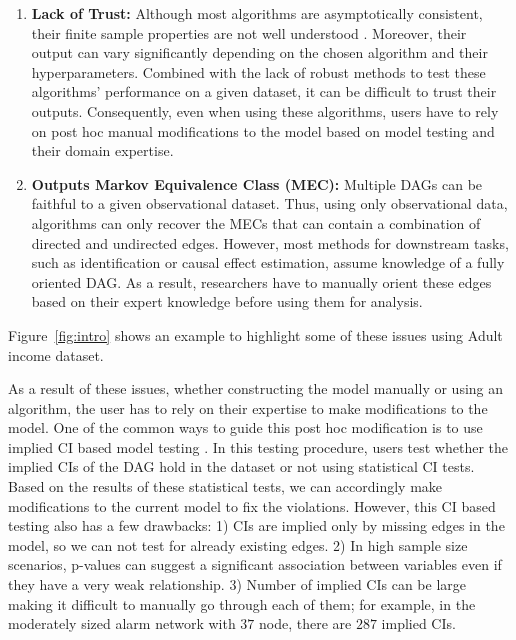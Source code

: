 \documentclass{uai2025} %
\begin{document}
\begin{enumerate}
	\item \textbf{Lack of Trust:} Although most algorithms are
		asymptotically consistent, their finite sample properties are
		not well understood .
		Moreover, their output can vary significantly depending on the
		chosen algorithm and their hyperparameters. Combined with the
		lack of robust methods to test these algorithms' performance on
		a given dataset, it can be difficult to trust their outputs.
		Consequently, even when using these algorithms, users have to
		rely on post hoc manual modifications to the model based on model
		testing and their domain expertise.
	\item \textbf{Outputs Markov Equivalence Class (MEC):} Multiple
		DAGs can be faithful to a given observational dataset. Thus,
		using only observational data, algorithms can only recover the
		MECs that can contain a combination of directed and undirected
		edges. However, most methods for downstream tasks, such as
		identification or causal effect estimation, assume knowledge of
		a fully oriented DAG. As a result, researchers have to manually
		orient these edges based on their expert knowledge before using
		them for analysis.
\end{enumerate}

Figure~\ref{fig:intro} shows an example to highlight some of these issues using 
Adult income dataset.


As a result of these issues, whether constructing the model manually or using
an algorithm, the user has to rely on their expertise to make modifications to
the model. One of the common ways to guide this post hoc modification is to use
implied CI based model testing \citep{Ankan2021, Ankan2023}. In this testing
procedure, users test whether the implied CIs of the DAG hold in the dataset or
not using statistical CI tests. Based on the results of these statistical
tests, we can accordingly make modifications to the current model to fix the
violations. However, this CI based testing also has a few drawbacks: 1) CIs are
implied only by missing edges in the model, so we can not test for already
existing edges. 2) In high sample size scenarios, p-values can suggest a
significant association between variables even if they have a very weak
relationship. 3) Number of implied CIs can be large making it difficult to
manually go through each of them; for example, in the moderately sized alarm
network with $ 37 $ node, there are $287$ implied CIs. 
\end{document}

